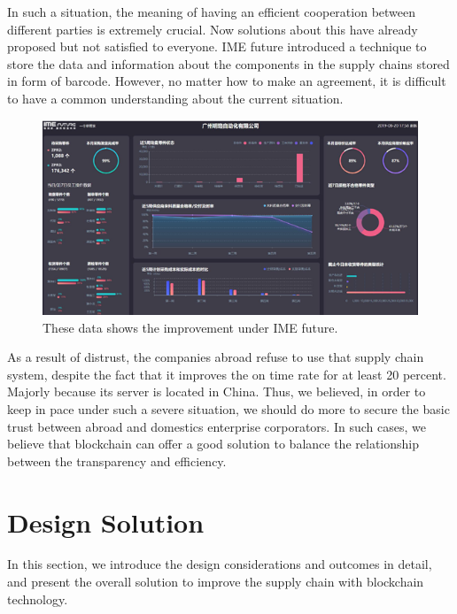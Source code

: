 \documentclass[12pt]{article}
\begin{document}
In such a situation, the meaning of having an efficient cooperation between 
different parties is extremely crucial. 
Now solutions about this have already proposed but not satisfied to everyone. 
IME future introduced a technique to store 
the data and information about the components in the supply chains stored in 
form of barcode. However, no matter how to 
make an agreement, it is difficult to have a common understanding about the 
current situation.
\begin{figure}
\centering
\includegraphics[width=1\textwidth]{efficiency.png}
\caption{\label{fig:efficiency}These data shows the improvement under IME future.}
\end{figure}
As a result of distrust, the companies abroad refuse to use that supply chain system, 
despite the fact that it improves 
the on time rate for at least 20 percent. Majorly because its server is located in China. 
Thus, we believed, in order to 
keep in pace under such a severe situation, we should do more to secure the basic 
trust between abroad and domestics
 enterprise corporators. In such cases, we believe that blockchain\cite{dus} 
 can offer a good solution to balance the 
 relationship between the transparency and efficiency. 


%

\section{Design Solution}
In this section, we introduce the design considerations and outcomes in detail, 
and present the overall solution to improve the supply chain with blockchain technology.
\end{document}

